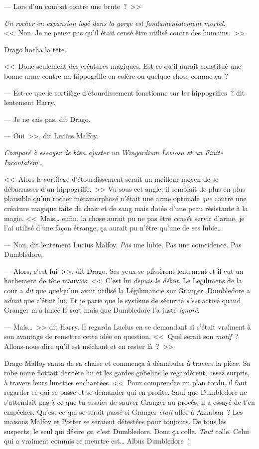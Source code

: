 --- Lors d'un combat contre une brute~?~>>

\emph{Un rocher en expansion logé dans la gorge est fondamentalement mortel.} <<~Non. Je ne pense pas qu'il était censé être utilisé contre des humains.~>>

Drago hocha la tête.

<<~Donc seulement des créatures magiques. Est-ce qu'il aurait constitué une bonne arme contre un hippogriffe en colère ou quelque chose comme ça~?

--- Est-ce que le sortilège d'étourdissement fonctionne sur les hippogriffes~? dit lentement Harry.

--- Je ne sais pas, dit Drago.

--- Oui~>>, dit Lucius Malfoy.

\emph{Comparé à essayer de bien ajuster un Wingardium Leviosa et un Finite Incantatem…}

<<~Alors le sortilège d'étourdissement serait un meilleur moyen de se débarrasser d'un hippogriffe.~>> Vu sous cet angle, il semblait de plus en plus plausible qu'un rocher métamorphosé n'était une arme optimale \emph{que} contre une créature magique faite de chair et de sang mais dotée d'une peau résistante à la magie. <<~Mais… enfin, la chose aurait pu ne pas être \emph{censée} servir d'arme, je l'ai utilisé d'une façon étrange, ça aurait pu n'être qu'une de ses lubie…

--- Non, dit lentement Lucius Malfoy. \emph{Pas} une lubie. Pas une coïncidence. Pas Dumbledore.

--- Alors, c'est lui~>>, dit Drago. Ses yeux se plissèrent lentement et il eut un hochement de tête mauvais. <<~C'est lui \emph{depuis le début}. Le Legilimens de la cour a \emph{dit} que quelqu'un avait utilisé la Légilimancie sur Granger. Dumbledore a \emph{admit} que c'était lui. Et je parie que le système de sécurité \emph{s'est} activé quand Granger m'a lancé le sort mais que Dumbledore l'a juste \emph{ignoré}.

--- Mais…~>> dit Harry. Il regarda Lucius en se demandant si c'était vraiment à son avantage de remettre cette idée en question. <<~Quel serait son \emph{motif}~? Allons-nous dire qu'il est méchant et en rester là~?~>>

Drago Malfoy sauta de sa chaise et commença à déambuler à travers la pièce. Sa robe noire flottait derrière lui et les gardes gobelins le regardèrent, assez surpris, à travers leurs lunettes enchantées. <<~Pour comprendre un plan tordu, il faut regarder ce qui se passe et se demander qui en profite. Sauf que Dumbledore ne s'attendait pas à ce que tu essaies de sauver Granger au procès, il a essayé de t'en empêcher. Qu'est-ce qui se serait passé si Granger \emph{était} allée à Azkaban~? Les maisons Malfoy et Potter se seraient détestées pour toujours. De tous les suspects, le seul qui désire \emph{ça}, c'est Dumbledore. Donc ça colle. \emph{Tout} colle. Celui qui a vraiment commis ce meurtre est… Albus Dumbledore~!

